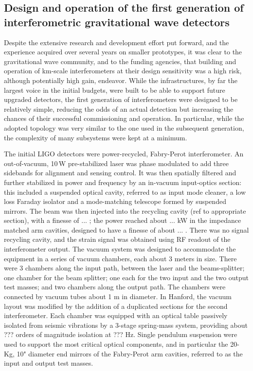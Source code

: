 \subsection{Design and operation of the first generation of interferometric gravitational wave detectors}\label{subsec:1stgen}

Despite the extensive research and development effort put forward, and the experience acquired over several years on smaller prototypes, it was clear to the gravitational wave community, and to the funding agencies, that building and operation of km-scale interferometers at their design sensitivity was a high risk, although potentially high gain, endeavor. While the infrastructures, by far the largest voice in the initial budgets, were built to be able to support future upgraded detectors, the first generation of interferometers were designed to be relatively simple, reducing the odds of an actual detection but increasing the chances of their successful commissioning and operation. In particular, while the adopted topology was very similar to the one used in the subsequent generation, the complexity of many subsystems were kept at a minimum.

The initial LIGO detectors were power-recycled, Fabry-Perot interferometer. An out-of-vacuum, 10\,W pre-stabilized laser was phase modulated to add three sidebands for alignment and sensing control. It was then spatially filtered and further stabilized in power and frequency by an in-vacuum input-optics section: this included a suspended optical cavity, referred to as input mode cleaner, a low loss Faraday isolator and a mode-matching telescope formed by suspended mirrors. The beam was then injected into the recycling cavity (ref to appropriate section), with a finesse of ... ; the power reached about ... kW in the impedance matched arm cavities, designed to have a finesse of about ... . There was no signal recycling cavity, and the strain signal was obtained using RF readout of the interferometer output.
The vacuum system was designed to accommodate the equipment in a series of vacuum chambers, each about 3 meters in size. There were 3 chambers along the input path, between the laser and the beams-splitter; one chamber for the beam splitter; one each for the two input and the two output test masses; and two chambers along the output path. The chambers were connected by vacuum tubes about 1 m in diameter. In Hanford, the vacuum layout was modified by the addition of a duplicated sections for the second interferometer.
Each chamber was equipped with an optical table passively isolated from seismic vibrations by a 3-stage spring-mass system, providing about ??? orders of magnitude isolation at ??? Hz. Single pendulum suspension were used to support the most critical optical components, and in particular the 20-Kg, 10" diameter end mirrors of the Fabry-Perot arm cavities, referred to as the input and output test masses.

